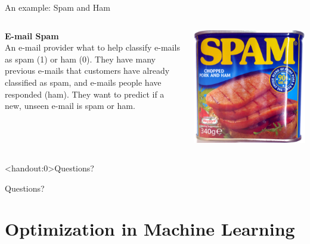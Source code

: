 \documentclass[10pt]{beamer}
\begin{document}
\begin{frame}{An example: Spam and Ham}

\begin{columns}
	\begin{column}{0.47\textwidth}
		\textbf{E-mail Spam}\\
An e-mail provider what to help classify e-mails as spam (1) or ham (0). They have many previous e-mails that customers have already classified as spam, and e-mails people have responded (ham). They want to predict if a new, unseen e-mail is spam or ham.
	\end{column}
	\begin{column}{0.5\textwidth}
		\includegraphics[width=\textwidth]{figs/spam.jpg}
	\end{column}
\end{columns}
\end{frame}


\begin{frame}<handout:0>{Questions?}

Questions?

\end{frame}



\section{Optimization in Machine Learning}
\frame{\sectionpage}
\end{document}
